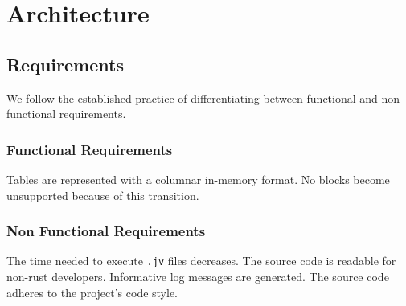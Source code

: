 \chapter{Architecture}
\label{chapter:Architecture}

\section{Requirements}
\label{section:Requirements}

We follow the established practice of differentiating between functional and non functional requirements.

\subsection{Functional Requirements}
\label{subsection:FunctionalRequirements}

Tables are represented with a columnar in-memory format.
No blocks become unsupported because of this transition.

\subsection{Non Functional Requirements}
\label{subsection:NonFunctionalRequirements}

The time needed to execute \texttt{.jv} files decreases.
The source code is readable for non-rust developers.
Informative log messages are generated.
The source code adheres to the project's code style.

